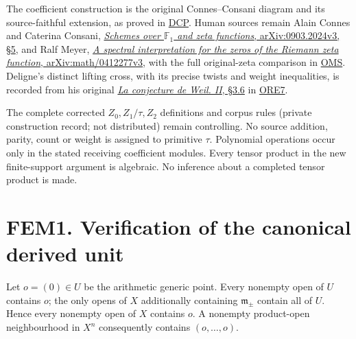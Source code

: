 The coefficient construction is the original Connes--Consani diagram and
its source-faithful extension, as proved in
\href{https://github.com/KokunoYumeto/zeta-function-research-reader/blob/36a82ecca98addb8a98b48204e349737856c7223/workbenches/splitzero-tandem/continuations/20260924-cohomology-weight-and-character-lifts/original-character-lifting/tau_lifting_weights_20260924/SOURCE_CC_DOUBLE_PULLBACK.md}{DCP}.
Human sources remain Alain Connes and Caterina Consani,
\href{https://arxiv.org/abs/0903.2024v3}{\emph{Schemes over
\(\mathbb F_1\) and zeta functions}, arXiv:0903.2024v3, §5}, and Ralf
Meyer, \href{https://arxiv.org/abs/math/0412277v3}{\emph{A spectral
interpretation for the zeros of the Riemann zeta function},
arXiv:math/0412277v3}, with the full original-zeta comparison in
\href{https://github.com/KokunoYumeto/zeta-function-research-reader/blob/36a82ecca98addb8a98b48204e349737856c7223/workbenches/splitzero-tandem/continuations/20260924-cohomology-weight-and-character-lifts/original-character-lifting/tau_lifting_weights_20260924/ORIGINAL_MELLIN_SPECTRAL_SYNTHESIS.md}{OMS}.
Deligne's distinct lifting cross, with its precise twists and weight
inequalities, is recorded from his original
\href{https://www.numdam.org/item/PMIHES_1980__52__137_0/}{\emph{La
conjecture de Weil. II}, §3.6} in
\href{https://github.com/KokunoYumeto/zeta-function-research-reader/blob/36a82ecca98addb8a98b48204e349737856c7223/workbenches/splitzero-tandem/continuations/20260924-cohomology-weight-and-character-lifts/original-character-lifting/tau_lifting_weights_20260924/ORIGINAL_RESTRICTION_EXTENSION_AND_DELIGNE_CROSS.md}{ORE7}.

The complete corrected \(Z_0,Z_1/\tau,Z_2\) definitions and corpus rules
(private construction record; not distributed) remain controlling. No
source addition, parity, count or weight is assigned to primitive
\(\tau\). Polynomial operations occur only in the stated receiving
coefficient modules. Every tensor product in the new finite-support
argument is algebraic. No inference about a completed tensor product is
made.

\section{FEM1. Verification of the canonical derived
unit}\label{fem1.-verification-of-the-canonical-derived-unit}

Let \(o=(0)\in U\) be the arithmetic generic point. Every nonempty open
of \(U\) contains \(o\); the only opens of \(X\) additionally containing
\(\mathfrak m_\pm\) contain all of \(U\). Hence every nonempty open of
\(X\) contains \(o\). A nonempty product-open neighbourhood in \(X^n\)
consequently contains \((o,\ldots,o)\).

